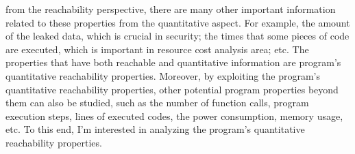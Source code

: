 from the reachability perspective,
there are many other
important information related to these properties from the quantitative aspect.
For example, the amount of the leaked data, which is crucial in security;
the times that some pieces of code are executed, which is important in resource cost analysis area; etc.
The properties that have both reachable and quantitative information are
program's quantitative reachability properties.
Moreover, 
by exploiting the program's quantitative reachability properties,
other potential program properties beyond them can also be 
studied,
such as the number of function calls,
program execution steps,
lines of executed codes,
the power consumption, memory usage, etc. 
To this end, I'm interested in
analyzing the program's quantitative reachability properties.
